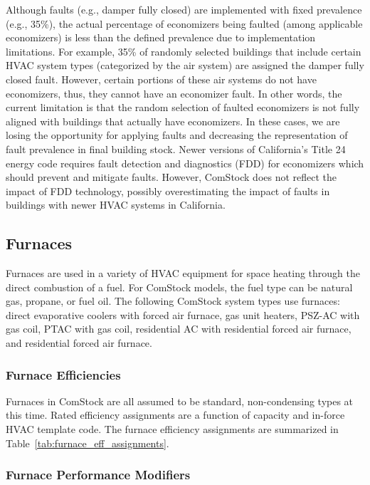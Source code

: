 Although faults (e.g., damper fully closed) are implemented with fixed prevalence (e.g., 35\%), the actual percentage of economizers being faulted (among applicable economizers) is less than the defined prevalence due to implementation limitations. For example, 35\% of randomly selected buildings that include certain HVAC system types (categorized by the air system) are assigned the damper fully closed fault. However, certain portions of these air systems do not have economizers, thus, they cannot have an economizer fault. In other words, the current limitation is that the random selection of faulted economizers is not fully aligned with buildings that actually have economizers. In these cases, we are losing the opportunity for applying faults and decreasing the representation of fault prevalence in final building stock. Newer versions of California's Title 24 energy code requires fault detection and diagnostics (FDD) for economizers which should prevent and mitigate faults. However, ComStock does not reflect the impact of FDD technology, possibly overestimating the impact of faults in buildings with newer HVAC systems in California.

\subsection{Furnaces}

Furnaces are used in a variety of HVAC equipment for space heating through the direct combustion of a fuel. For ComStock models, the fuel type can be natural gas, propane, or fuel oil. The following ComStock system types use furnaces: direct evaporative coolers with forced air furnace, gas unit heaters, PSZ-AC with gas coil, PTAC with gas coil, residential AC with residential forced air furnace, and residential forced air furnace.

\subsubsection{Furnace Efficiencies}

Furnaces in ComStock are all assumed to be standard, non-condensing types at this time. Rated efficiency assignments are a function of capacity and in-force HVAC template code. The furnace efficiency assignments are summarized in Table~\ref{tab:furnace_eff_assignments}.

\subsubsection{Furnace Performance Modifiers}

